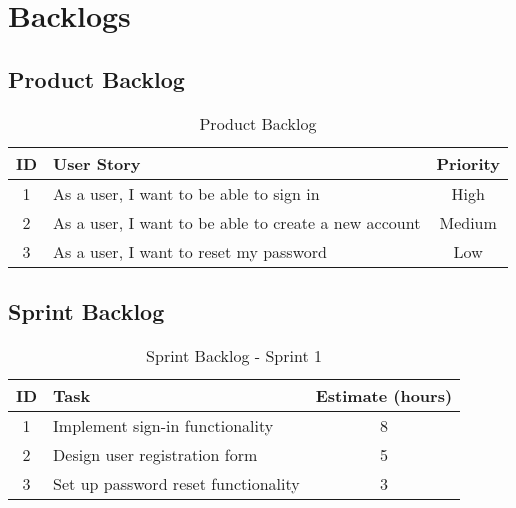 \section{Backlogs}\label{backlog}

\subsection{Product Backlog}\label{product_backlog}

\begin{table}[h]
    \centering
    \caption*{Product Backlog}
    \begin{tabular}{|c|p{5cm}|c|}
        \hline
        \textbf{ID} & \textbf{User Story} & \textbf{Priority} \\
        \hline
        1 & As a user, I want to be able to sign in & High \\
        \hline
        2 & As a user, I want to be able to create a new account & Medium \\
        \hline
        3 & As a user, I want to reset my password & Low \\
        \hline
    \end{tabular}
\end{table}

\subsection{Sprint Backlog}\label{sprint_backlog}

\begin{table}[h]
    \centering
    \caption*{Sprint Backlog - Sprint 1}
    \begin{tabular}{|c|p{5cm}|c|}
        \hline
        \textbf{ID} & \textbf{Task} & \textbf{Estimate (hours)} \\
        \hline
        1 & Implement sign-in functionality & 8 \\
        \hline
        2 & Design user registration form & 5 \\
        \hline
        3 & Set up password reset functionality & 3 \\
        \hline
    \end{tabular}
\end{table}
